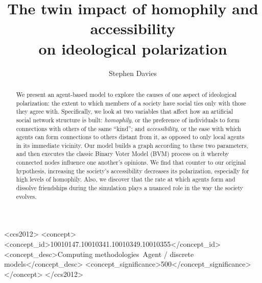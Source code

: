 \documentclass[sigconf]{acmart}
\begin{document}
\title[The twin impact of homophily and accessibility on ideological
polarization]{The twin impact of homophily and accessibility\\on ideological
polarization}


\author{Stephen Davies}

\renewcommand{\shortauthors}{S. Davies}


\begin{abstract}
We present an agent-based model to explore the causes of one aspect of
ideological polarization: the extent to which members of a society have social
ties only with those they agree with. Specifically, we look at two variables
that affect how an artificial social network structure is built:
\textit{homophily}, or the preference of individuals to form connections with
others of the same ``kind''; and \textit{accessibility}, or the ease with which
agents can form connections to others distant from it, as opposed to only
local agents in its immediate vicinity. Our model builds a graph according to
these two parameters, and then executes the classic Binary Voter Model (BVM)
process on it whereby connected nodes influence one another's opinions. We
find that counter to our original hypothesis, increasing the society's
accessibility decreases its polarization, especially for high levels of
homophily. Also, we discover that the rate at which agents form and dissolve
friendships during the simulation plays a nuanced role in the way the society
evolves.
\end{abstract}

%
%
\begin{CCSXML}
<ccs2012>
<concept>
<concept_id>10010147.10010341.10010349.10010355</concept_id>
<concept_desc>Computing methodologies~Agent / discrete models</concept_desc>
<concept_significance>500</concept_significance>
</concept>
</ccs2012>
\end{CCSXML}





\maketitle



\appendix



\end{document}

